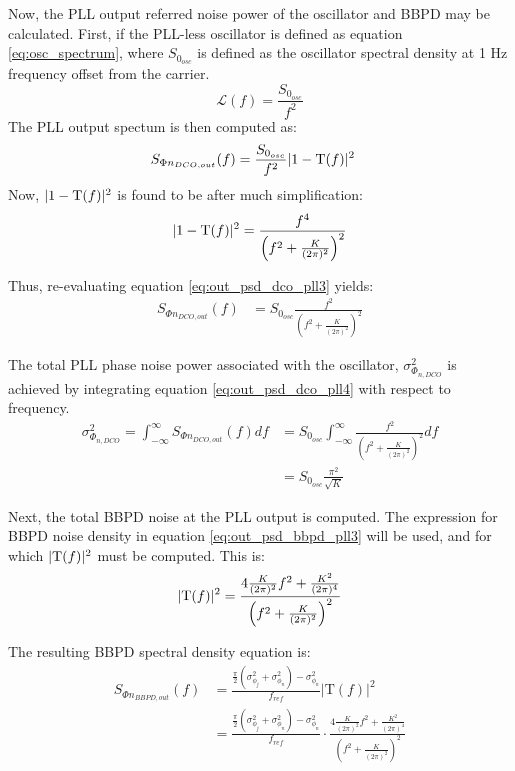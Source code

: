 			Now, the PLL output referred noise power of the oscillator and BBPD may be calculated. First, if the PLL-less oscillator is defined as equation \ref{eq:osc_spectrum}, where $S_{0_{osc}}$ is defined as the oscillator spectral density at 1 Hz frequency offset from the carrier. 
			\begin{equation}\label{eq:osc_spectrum} 
				\mathcal{L}(f) = \frac{S_{0_{osc}}}{f^2} 
			\end{equation} 
			The PLL output spectum is then computed as: 
			\begin{align}\label{eq:out_psd_dco_pll3} 
				S_{\Phi n_{DCO,out}}(f) &= \frac{S_{0_{osc}}}{f^2}|1-\textnormal{T}(f)|^2  
			\end{align} Now, $|1-\textnormal{T}(f)|^2$ is found to be after much simplification:
			\begin{equation} |1-\textnormal{T}(f)|^2 =
				\frac{f^4}{\left(f^2+\frac{K}{(2\pi)^2}\right)^2} 
			\end{equation} 

			Thus, re-evaluating equation \ref{eq:out_psd_dco_pll3} yields:
			\begin{align}\label{eq:out_psd_dco_pll4} 
				S_{\Phi n_{DCO,out}}(f) &= S_{0_{osc}}\frac{f^2}{\left(f^2+\frac{K}{(2\pi)^2}\right)^2} 
			\end{align} 

			The total PLL phase noise power associated with the oscillator, $\sigma_{\Phi_{n,DCO}}^2$ is achieved by integrating equation \ref{eq:out_psd_dco_pll4} with respect to frequency.
			\begin{align}\label{eq:out_psd_dco_pll5} \sigma_{\Phi_{n,DCO}}^2 =
				\int_{-\infty}^{\infty} S_{\Phi n_{DCO,out}}(f)df &=
				S_{0_{osc}}\int_{-\infty}^{\infty}\frac{f^2}{\left(f^2+\frac{K}{(2\pi)^2}\right)^2}df
				\\ &= S_{0_{osc}}\frac{\pi^2}{\sqrt{K}} 
			\end{align} 

			Next, the total BBPD noise at the PLL output is computed. The expression for BBPD noise density in equation \ref{eq:out_psd_bbpd_pll3} will be used, and for which $|\textnormal{T}(f)|^2$ must be computed. This is: 
			\begin{equation} 
				|\textnormal{T}(f)|^2 =
				\frac{4\frac{K}{(2\pi)^2}f^2 +
				\frac{K^2}{(2\pi)^4}}{\left(f^2+\frac{K}{(2\pi)^2}\right)^2} 
			\end{equation}

			The resulting BBPD spectral density equation is:
			\begin{align}\label{eq:out_psd_bbpd_pll4} 
				S_{\Phi n_{BBPD,out}}(f) & =
				\frac{\frac{\pi}{2}(\sigma^2_{\phi_j} +
				\sigma^2_{\phi_n})-\sigma^2_{\phi_n}}{f_{ref}}\left|\mathrm{T}(f)\right|^2
				\\&= \frac{\frac{\pi}{2}(\sigma^2_{\phi_j} +
				\sigma^2_{\phi_n})-\sigma^2_{\phi_n}}{f_{ref}}\cdot\frac{4\frac{K}{(2\pi)^2}f^2
				+ \frac{K^2}{(2\pi)^4}}{\left(f^2+\frac{K}{(2\pi)^2}\right)^2} 
			\end{align} 

